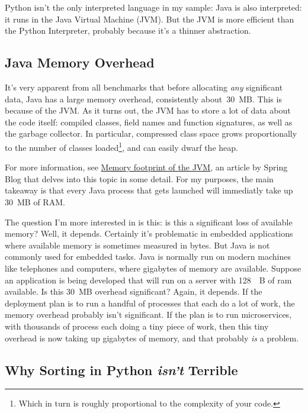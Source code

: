 \documentclass[12pt,letterpaper]{article}
\begin{document}
Python isn't the only interpreted language in my sample: Java is also
interpreted: it runs in the Java Virtual Machine (JVM). But the JVM is more
efficient than the Python Interpreter, probably because it's a thinner
abstraction.

\subsection{Java Memory Overhead}

It's very apparent from all benchmarks that before allocating \emph{any}
significant data, Java has a large memory overhead, consistently
about~\SI{30}{\mega B}. This is because of the JVM. As it turns out, the JVM
has to store a lot of data about the code itself: compiled classes, field names
and function signatures, as well as the garbage collector. In particular,
compressed class space grows proportionally to the number of classes
loaded\footnote{Which in turn is roughly proportional to the complexity of your
code.}, and can easily dwarf the heap.

For more information, see
\href{https://spring.io/blog/2019/03/11/memory-footprint-of-the-jvm}{Memory
footprint of the JVM}, an article by Spring Blog that delves into this topic in
some detail. For my purposes, the main takeaway is that every Java process that
gets launched will immediatly take up \SI{30}{\mega B} of RAM.

The question I'm more interested in is this: is this a significant loss of
available memory? Well, it depends. Certainly it's problematic in embedded
applications where available memory is sometimes measured in bytes. But Java is
not commonly used for embedded tasks. Java is normally run on modern machines
like telephones and computers, where gigabytes of memory are available. Suppose
an application is being developed that will run on a server with \SI{128}{\giga
B} of ram available. Is this \SI{30}{\mega B} overhead significant? Again, it
depends. If the deployment plan is to run a handful of processes that each do
a lot of work, the memory overhead probably isn't significant. If the plan is
to run microservices, with thousands of process each doing a tiny piece of
work, then this tiny overhead is now taking up gigabytes of memory, and that
probably \emph{is} a problem.

\subsection{Why Sorting in Python \emph{isn't} Terrible}
\end{document}

